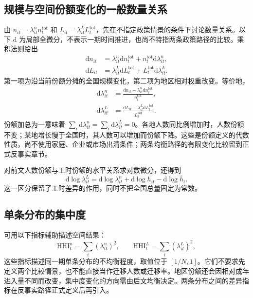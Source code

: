 \documentclass[UTF8,a4paper,zihao=-4,fontset=windows]{ctexart}
\numberwithin{equation}{section}
\newcommand{\dd}{\mathrm{d}}
\begin{document}
\subsection{规模与空间份额变化的一般数量关系}
由 $n_{it}=\lambda^n_{it}n_t^{\mathrm{tot}}$ 和 $L_{it}=\lambda^L_{it}L_t^{\mathrm{tot}}$，先在不指定政策情景的条件下讨论数量关系。以下 $\dd$ 为局部全微分，不表示一期时间推进，也尚不特指两条政策路径的比较。乘积法则给出
\begin{align}
 \dd n_{it}&=\lambda^n_{it}\dd n_t^{\mathrm{tot}}
 +n_t^{\mathrm{tot}}\dd\lambda^n_{it},\\
 \dd L_{it}&=\lambda^L_{it}\dd L_t^{\mathrm{tot}}
 +L_t^{\mathrm{tot}}\dd\lambda^L_{it}.
 \label{eq:lg-scale-distribution-differential}
\end{align}
第一项为沿当前份额分摊的全国规模变化，第二项为地区相对权重改变。等价地，
\begin{align}
 \dd\lambda^n_{it}&=\frac{\dd n_{it}-\lambda^n_{it}\dd n_t^{\mathrm{tot}}}{n_t^{\mathrm{tot}}},\\
 \dd\lambda^L_{it}&=\frac{\dd L_{it}-\lambda^L_{it}\dd L_t^{\mathrm{tot}}}{L_t^{\mathrm{tot}}}.
 \label{eq:lg-general-share-differential}
\end{align}
份额加总为一意味着 $\sum_i\dd\lambda^n_{it}=\sum_i\dd\lambda^L_{it}=0$。各地人数同比例增加时，人数份额不变；某地增长慢于全国时，其人数可以增加而份额下降。这些是份额定义的代数性质，尚不使用家庭、企业或市场出清条件；两条均衡路径的有限变化比较留到正式反事实章节。

对前文人数份额与工时份额的水平关系求对数微分，还得到
\begin{equation}
 \dd\log\lambda^L_{it}=\dd\log\lambda^n_{it}+\dd\log h_{it}-\dd\log\bar h_t.
 \label{eq:lg-share-hours-differential}
\end{equation}
这一区分保留了工时差异的作用，同时不把全国总量固定为常数。

\subsection{单条分布的集中度}
可用以下指标辅助描述空间结果：
\begin{equation}
 \mathrm{HHI}^n_t=\sum_i(\lambda^n_{it})^2,\qquad
 \mathrm{HHI}^L_t=\sum_i(\lambda^L_{it})^2,
 \label{eq:lg-concentration-index}
\end{equation}
这些指标描述同一期单条分布的不均衡程度，取值位于 $[1/N,1]$。它们不要求先定义两个比较情景，也不能直接当作迁移人数或迁移率。地区份额还会因相对成年进入量不同而改变，集中度变化的方向需由后文均衡决定。两条分布之间的差异指标在反事实路径正式定义后再引入。
\end{document}
